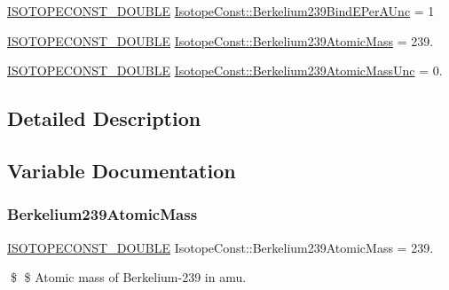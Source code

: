 \begin{DoxyCompactItemize}
\mbox{\hyperlink{group___isotope_const-_macros_ga8f45a7272ce02c0b4c65c44636ed719a}{I\+S\+O\+T\+O\+P\+E\+C\+O\+N\+S\+T\+\_\+\+D\+O\+U\+B\+LE}} \mbox{\hyperlink{group___isotope_const-_berkelium-_bk239_gab63154360603f635f882b9b3c71667a8}{Isotope\+Const\+::\+Berkelium239\+Bind\+E\+Per\+A\+Unc}} = 1
\item 
\mbox{\hyperlink{group___isotope_const-_macros_ga8f45a7272ce02c0b4c65c44636ed719a}{I\+S\+O\+T\+O\+P\+E\+C\+O\+N\+S\+T\+\_\+\+D\+O\+U\+B\+LE}} \mbox{\hyperlink{group___isotope_const-_berkelium-_bk239_ga3a938770466fe637920d27c5246410b0}{Isotope\+Const\+::\+Berkelium239\+Atomic\+Mass}} = 239.
\item 
\mbox{\hyperlink{group___isotope_const-_macros_ga8f45a7272ce02c0b4c65c44636ed719a}{I\+S\+O\+T\+O\+P\+E\+C\+O\+N\+S\+T\+\_\+\+D\+O\+U\+B\+LE}} \mbox{\hyperlink{group___isotope_const-_berkelium-_bk239_gaefd786a3b19397b2807095d06a6b0dd4}{Isotope\+Const\+::\+Berkelium239\+Atomic\+Mass\+Unc}} = 0.
\end{DoxyCompactItemize}


\subsection{Detailed Description}


\subsection{Variable Documentation}
\mbox{\label{group___isotope_const-_berkelium-_bk239_ga3a938770466fe637920d27c5246410b0}} 
\subsubsection{\texorpdfstring{Berkelium239\+Atomic\+Mass}{Berkelium239AtomicMass}}
{\footnotesize\ttfamily \mbox{\hyperlink{group___isotope_const-_macros_ga8f45a7272ce02c0b4c65c44636ed719a}{I\+S\+O\+T\+O\+P\+E\+C\+O\+N\+S\+T\+\_\+\+D\+O\+U\+B\+LE}} Isotope\+Const\+::\+Berkelium239\+Atomic\+Mass = 239.}

\$ \$ Atomic mass of Berkelium-\/239 in amu. \mbox{\label{group___isotope_const-_berkelium-_bk239_gaefd786a3b19397b2807095d06a6b0dd4}} 
